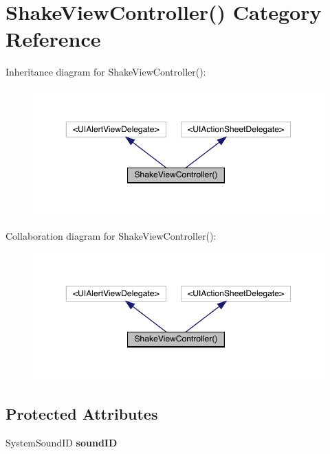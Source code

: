 \hypertarget{category_shake_view_controller_07_08}{}\section{Shake\+View\+Controller() Category Reference}
\label{category_shake_view_controller_07_08}


Inheritance diagram for Shake\+View\+Controller()\+:\nopagebreak
\begin{figure}[H]
\begin{center}
\leavevmode
\includegraphics[width=350pt]{category_shake_view_controller_07_08__inherit__graph}
\end{center}
\end{figure}


Collaboration diagram for Shake\+View\+Controller()\+:\nopagebreak
\begin{figure}[H]
\begin{center}
\leavevmode
\includegraphics[width=350pt]{category_shake_view_controller_07_08__coll__graph}
\end{center}
\end{figure}
\subsection*{Protected Attributes}
\begin{DoxyCompactItemize}
\item 
\mbox{\label{category_shake_view_controller_07_08_a8597e2c7430b270d7af5f7a60d7f1559}} 
System\+Sound\+ID {\bfseries sound\+ID}
\end{DoxyCompactItemize}
